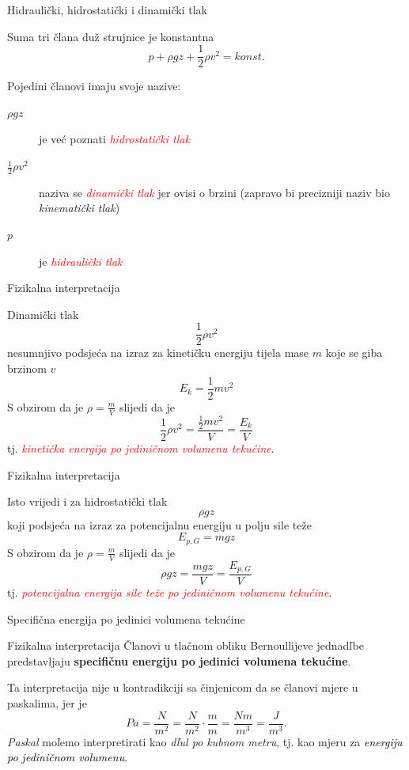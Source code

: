 \documentclass[croatian]{beamer}
\begin{document}
\begin{frame}{Hidraulički, hidrostatički i dinamički tlak}

Suma tri člana duž strujnice je konstantna
\[
p+\rho gz+\frac{1}{2}\rho v^{2}=konst.
\]
\begin{block}{Pojedini članovi imaju svoje nazive:}
\begin{description}
\item [{$\rho gz$}] je već poznati \textcolor{red}{\emph{hidrostatički
tlak}}
\item [{$\frac{1}{2}\rho v^{2}$}] naziva se \textcolor{red}{\emph{dinamički
tlak}} jer ovisi o brzini (zapravo bi precizniji naziv bio \emph{kinematički
tlak})
\item [{$p$}] je \textcolor{red}{\emph{hidraulički tlak}}
\end{description}
\end{block}
\end{frame}

\begin{frame}{Fizikalna interpretacija}

Dinamički tlak
\[
\frac{1}{2}\rho v^{2}
\]
nesumnjivo podsjeća na izraz za kinetičku energiju tijela mase $m$
koje se giba brzinom $v$
\[
E_{k}=\frac{1}{2}mv^{2}
\]
S obzirom da je $\rho=\frac{m}{V}$ slijedi da je
\[
\frac{1}{2}\rho v^{2}=\frac{\frac{1}{2}mv^{2}}{V}=\frac{E_{k}}{V}
\]
tj. \textcolor{red}{\emph{kinetička energija po jediničnom volumenu
tekućine}}.
\end{frame}

\begin{frame}{Fizikalna interpretacija}

Isto vrijedi i za hidrostatički tlak
\[
\rho gz
\]
koji podsjeća na izraz za potencijalnu energiju u polju sile teže
\[
E_{p,G}=mgz
\]
S obzirom da je $\rho=\frac{m}{V}$ slijedi da je
\[
\rho gz=\frac{mgz}{V}=\frac{E_{p,G}}{V}
\]
tj. \textcolor{red}{\emph{potencijalna energija sile teže po jediničnom
volumenu tekućine}}.

\end{frame}

\begin{frame}{Specifična energija po jedinici volumena tekućine}

\begin{alertblock}{Fizikalna interpretacija}
 Članovi u tlačnom obliku Bernoullijeve jednadľbe predstavljaju \textbf{specifičnu
energiju po jedinici volumena tekućine}.
\end{alertblock}

Ta interpretacija nije u kontradikciji sa činjenicom da se članovi
mjere u paskalima, jer je
\[
Pa=\frac{N}{m^{2}}=\frac{N}{m^{2}}\cdot\frac{m}{m}=\frac{Nm}{m^{3}}=\frac{J}{m^{3}}.
\]
\emph{Paskal} moľemo interpretirati kao \emph{dľul po kubnom metru},
tj. kao mjeru za \textcolor{black}{\emph{energiju po jediničnom volumenu}}.
\end{frame}
\end{document}
